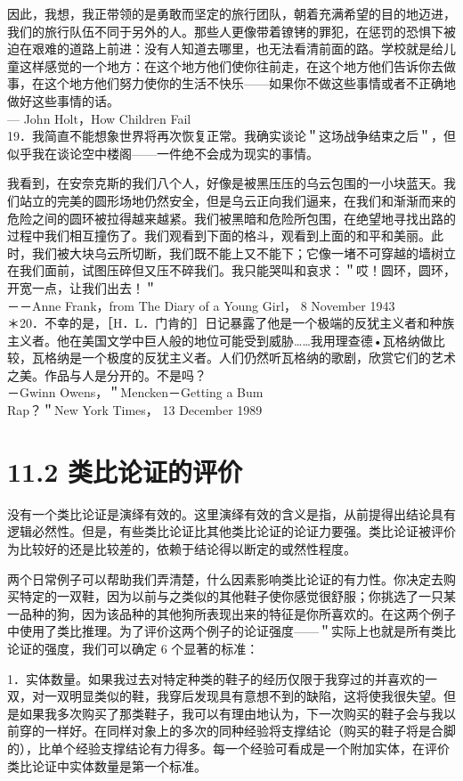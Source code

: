 因此，我想，我正带领的是勇敢而坚定的旅行团队，朝着充满希望的目的地迈进，我们的旅行队伍不同于另外的人。那些人更像带着镣铐的罪犯，在惩罚的恐惧下被迫在艰难的道路上前进：没有人知道去哪里，也无法看清前面的路。学校就是给儿童这样感觉的一个地方：在这个地方他们使你往前走，在这个地方他们告诉你去做事，在这个地方他们努力使你的生活不快乐——如果你不做这些事情或者不正确地做好这些事情的话。\\
— John Holt，How Children Fail\\
19．我简直不能想象世界将再次恢复正常。我确实谈论＂这场战争结束之后＂，但似乎我在谈论空中楼阁——一件绝不会成为现实的事情。

我看到，在安奈克斯的我们八个人，好像是被黑压压的乌云包围的一小块蓝天。我们站立的完美的圆形场地仍然安全，但是乌云正向我们逼来，在我们和渐渐而来的危险之间的圆环被拉得越来越紧。我们被黑暗和危险所包围，在绝望地寻找出路的过程中我们相互撞伤了。我们观看到下面的格斗，观看到上面的和平和美丽。此时，我们被大块乌云所切断，我们既不能上又不能下；它像一堵不可穿越的墙树立在我们面前，试图压碎但又压不碎我们。我只能哭叫和哀求：＂哎！圆环，圆环，开宽一点，让我们出去！＂\\
－－Anne Frank，from The Diary of a Young Girl， 8 November 1943\\
＊20．不幸的是，［H．L．门肯的］日记暴露了他是一个极端的反犹主义者和种族主义者。他在美国文学中巨人般的地位可能受到威胁……我用理查德•瓦格纳做比较，瓦格纳是一个极度的反犹主义者。人们仍然听瓦格纳的歌剧，欣赏它们的艺术之美。作品与人是分开的。不是吗？\\
－Gwinn Owens，＂Mencken－Getting a Bum\\
Rap？＂New York Times， 13 December 1989

\section*{11.2 类比论证的评价}
没有一个类比论证是演绎有效的。这里演绎有效的含义是指，从前提得出结论具有逻辑必然性。但是，有些类比论证比其他类比论证的论证力要强。类比论证被评价为比较好的还是比较差的，依赖于结论得以断定的或然性程度。

两个日常例子可以帮助我们弄清楚，什么因素影响类比论证的有力性。你决定去购买特定的一双鞋，因为以前与之类似的其他鞋子使你感觉很舒服；你挑选了一只某一品种的狗，因为该品种的其他狗所表现出来的特征是你所喜欢的。在这两个例子中使用了类比推理。为了评价这两个例子的论证强度——＂实际上也就是所有类比论证的强度，我们可以确定 6 个显著的标准：

1．实体数量。如果我过去对特定种类的鞋子的经历仅限于我穿过的并喜欢的一双，对一双明显类似的鞋，我穿后发现具有意想不到的缺陷，这将使我很失望。但是如果我多次购买了那类鞋子，我可以有理由地认为，下一次购买的鞋子会与我以前穿的一样好。在同样对象上的多次的同种经验将支撑结论（购买的鞋子将是合脚的），比单个经验支撑结论有力得多。每一个经验可看成是一个附加实体，在评价类比论证中实体数量是第一个标准。

